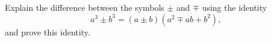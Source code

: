 Explain the difference between the symbols $\pm$ and $\mp$ using the identity
\[
a^3\pm b^3=(a\pm b)\left(a^2\mp ab+b^2\right),
\]
and prove this identity.

